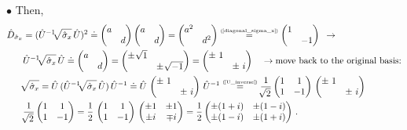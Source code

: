 \documentclass[11pt]{article}
\numberwithin{equation}{section} %
\numberwithin{figure}{section} %
\newcommand\numeq[1] %
  {\stackrel{\scriptscriptstyle(\mkern-1.5mu#1\mkern-1.5mu)}{=}}
\begin{document}
\begin{appendices}
\noindent $\bullet$ Then, 
\begin{equation} 
\begin{split}
\hat{D}_{\hat{\sigma}_x} 
&	= (\hat{U}^{-1}\sqrt[]{\hat{\sigma}_x}\,\hat{U})^2 \doteq \begin{pmatrix}a&\\&d\end{pmatrix} \begin{pmatrix}a&\\&d\end{pmatrix} = \begin{pmatrix}a^2&\\&d^2\end{pmatrix} \numeq{\textrm{\ref{diagonal_sigma_x}}} \begin{pmatrix}1&\\&-1\end{pmatrix} \,\,\, \rightarrow \\
&	\hat{U}^{-1}\sqrt[]{\hat{\sigma}_x}\,\hat{U} \doteq \begin{pmatrix}a&\\&d\end{pmatrix} = \begin{pmatrix}\pm\,\,\sqrt[]{1}&\\&\pm\,\,\sqrt[]{-1}\end{pmatrix} = \begin{pmatrix}\pm\,\,1&\\&\pm\,\,i\end{pmatrix}\,\,\,\,\,\,\rightarrow \textrm{move back to the original basis:}\\
&	\sqrt[]{\hat{\sigma}_x} = \hat{U}\,(\hat{U}^{-1}\sqrt[]{\hat{\sigma}_x}\,\hat{U})\,\hat{U}^{-1} \doteq \hat{U}\, \begin{pmatrix}\pm\,\,1&\\&\pm\,\,i\end{pmatrix} \,\hat{U}^{-1} \numeq{\textrm{\ref{U_inverse}}} \frac{1}{\sqrt[]{2}}\begin{pmatrix}1&1\\1&-1\end{pmatrix}\, \begin{pmatrix}\pm\,\,1&\\&\pm\,\,i\end{pmatrix}\\
&	\frac{1}{\sqrt[]{2}}\begin{pmatrix}1&1\\1&-1\end{pmatrix} = \frac{1}{2}\,\begin{pmatrix}1&1\\1&-1\end{pmatrix}\,\begin{pmatrix}\pm 1&\pm 1\\\pm i&\mp i\end{pmatrix}=\frac{1}{2}\begin{pmatrix}\pm(1+i)&\pm(1-i)\\\pm(1-i)&\pm(1+i)\end{pmatrix}\,\textrm{.}

\end{split}
\end{equation}
\end{appendices}
\end{document}
